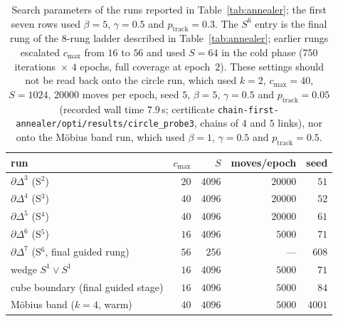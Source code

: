 \documentclass[12pt]{article}
\begin{document}
\begin{table}[H]
\centering\footnotesize
\begin{tabular}{@{}lrrrr@{}}
\toprule
run & $c_{\max}$ & $S$ & moves/epoch & seed \\
\midrule
$\partial\Delta^3$ (S$^2$) & $20$ & $4096$ & $20000$ & $51$\\
$\partial\Delta^4$ (S$^3$) & $40$ & $4096$ & $20000$ & $52$\\
$\partial\Delta^5$ (S$^4$) & $40$ & $4096$ & $20000$ & $61$\\
$\partial\Delta^6$ (S$^5$) & $16$ & $4096$ & $5000$ & $71$\\
$\partial\Delta^7$ (S$^6$, final guided rung) & $56$ & $256$ & --- & $608$\\
wedge $S^1\vee S^1$ & $16$ & $4096$ & $5000$ & $71$\\
cube boundary (final guided stage) & $16$ & $4096$ & $5000$ & $84$\\
M\"obius band ($k{=}4$, warm) & $40$ & $4096$ & $5000$ & $4001$\\
\bottomrule
\end{tabular}
\caption{Search parameters of the runs reported in
Table~\ref{tab:annealer}; the first seven rows used $\beta=5$, $\gamma=0.5$ and
$p_{\mathrm{track}}=0.3$.  The $S^6$ entry is the final rung of the
$8$-rung ladder described in Table~\ref{tab:annealer}; earlier rungs
escalated $c_{\max}$ from $16$ to $56$ and used $S{=}64$ in the cold
phase ($750$ iterations~$\times$ $4$ epochs, full coverage at epoch~$2$).  These settings should not be read back onto
the circle run, which used $k=2$, $c_{\max}=40$, $S=1024$, $20000$
moves per epoch, seed $5$, $\beta=5$, $\gamma=0.5$ and
$p_{\mathrm{track}}=0.05$ (recorded wall time $7.9$\,s; certificate
\texttt{chain-first-annealer/opti/results/circle\_probe3}, chains of
$4$ and $5$ links), nor onto the M\"obius band run, which used
$\beta=1$, $\gamma=0.5$ and $p_{\mathrm{track}}=0.5$.}
\label{tab:params}
\end{table}
\end{document}
